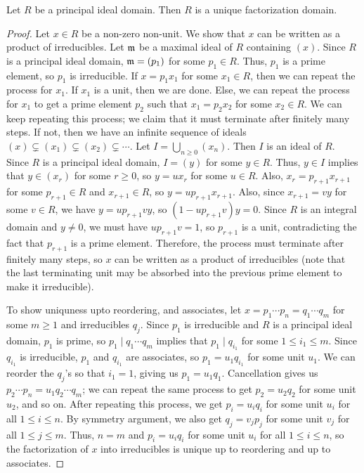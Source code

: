 \begin{theorem}
    Let $R$ be a principal ideal domain. Then $R$ is a unique factorization domain.
\end{theorem}
\begin{proof}
    Let $x \in R$ be a non-zero non-unit. We show that $x$ can be written as a product of irreducibles. Let $\mathfrak{m}$ be a maximal ideal of $R$ containing $(x)$. Since $R$ is a principal ideal domain, $\mathfrak{m} = (p_{1})$ for some $p_{1} \in R$. Thus, $p_{1}$ is a prime element, so $p_{1}$ is irreducible. If $x = p_{1} x_{1}$ for some $x_{1} \in R$, then we can repeat the process for $x_{1}$. If $x_{1}$ is a unit, then we are done. Else, we can repeat the process for $x_{1}$ to get a prime element $p_{2}$ such that $x_{1} = p_{2} x_{2}$ for some $x_{2} \in R$. We can keep repeating this process; we claim that it must terminate after finitely many steps. If not, then we have an infinite sequence of ideals $(x) \subsetneq (x_{1}) \subsetneq (x_{2}) \subsetneq \cdots$. Let $I = \bigcup_{n \geq 0} (x_{n})$. Then $I$ is an ideal of $R$. Since $R$ is a principal ideal domain, $I = (y)$ for some $y \in R$. Thus, $y \in I$ implies that $y \in (x_{r})$ for some $r \geq 0$, so $y = ux_{r}$ for some $u \in R$. Also, $x_{r} = p_{r+1}x_{r+1}$ for some $p_{r+1} \in R$ and $x_{r+1} \in R$, so $y = u p_{r+1} x_{r+1}$. Also, since $x_{r+1} = vy$ for some $v \in R$, we have $y = u p_{r+1} vy$, so $(1 - up_{r+1}v)y = 0$. Since $R$ is an integral domain and $y \neq 0$, we must have $up_{r+1}v = 1$, so $p_{r+1}$ is a unit, contradicting the fact that $p_{r+1}$ is a prime element. Therefore, the process must terminate after finitely many steps, so $x$ can be written as a product of irreducibles (note that the last terminating unit may be absorbed into the previous prime element to make it irreducible).

    To show uniquness upto reordering, and associates, let $x = p_{1} \cdots p_{n} = q_{1} \cdots q_{m}$ for some $m \geq 1$ and irreducibles $q_{j}$. Since $p_{1}$ is irreducible and $R$ is a principal ideal domain, $p_{1}$ is prime, so $p_{1} \mid q_{1} \cdots q_{m}$ implies that $p_{1} \mid q_{i_{1}}$ for some $1 \leq i_{1} \leq m$. Since $q_{i_{1}}$ is irreducible, $p_{1}$ and $q_{i_{1}}$ are associates, so $p_{1} = u_{1} q_{i_{1}}$ for some unit $u_{1}$. We can reorder the $q_{j}$'s so that $i_{1} = 1$, giving us $p_{1} = u_{1} q_{1}$. Cancellation gives us $p_{2} \cdots p_{n} = u_{1} q_{2} \cdots q_{m}$; we can repeat the same process to get $p_{2} = u_{2} q_{2}$ for some unit $u_{2}$, and so on. After repeating this process, we get $p_{i} = u_{i} q_{i}$ for some unit $u_{i}$ for all $1 \leq i \leq n$. By symmetry argument, we also get $q_{j} = v_{j} p_{j}$ for some unit $v_{j}$ for all $1 \leq j \leq m$. Thus, $n = m$ and $p_{i} = u_{i} q_{i}$ for some unit $u_{i}$ for all $1 \leq i \leq n$, so the factorization of $x$ into irreducibles is unique up to reordering and up to associates.
\end{proof}

